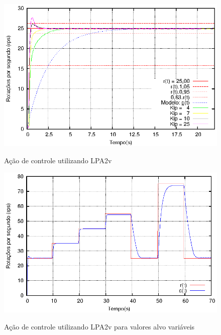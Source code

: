 













\begin{figure}[!htb]
\caption{Ação de controle utilizando LPA2v}
\vspace{-1cm}\center\includegraphics[scale=1.6]{./imagens/klpAll.eps}
\label{fig:acaoLPA2v}
\end{figure}

\begin{figure}[!htb]
\caption{Ação de controle utilizando LPA2v para valores alvo variáveis}
\vspace{-1cm}
\center\includegraphics[scale=1.4]{./imagens/patam85.eps}
\label{fig:acaoLPA2vpatam85}
\end{figure}








